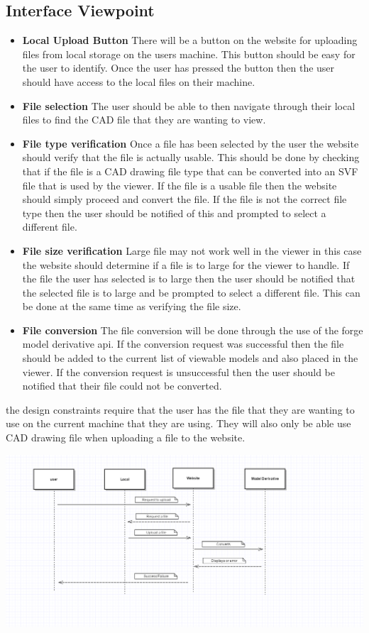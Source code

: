 \documentclass[letterpaper, 10pt, draftclsnofoot, compsoc, onecolumn]{IEEEtran}
\begin{document}
\subsection{Interface Viewpoint}
\begin{itemize}
	\item[]\textbf{Local Upload Button} There will be a button on the website for uploading files from local storage on the users machine. This button should be easy for the user to identify. Once the user has pressed the button then the user should have access to the local files on their machine.
	\item[]\textbf{File selection} The user should be able to then navigate through their local files to find the CAD file that they are wanting to view.
	\item[]\textbf{File type verification} Once a file has been selected by the user the website should verify that the file is actually usable. This should be done by checking that if the file is a CAD drawing file type that can be converted into an SVF file that is used by the viewer. If the file is a usable file then the website 			should simply proceed and convert the file. If the file is not the correct file type then the user should be notified of this and prompted to select a different file.  
	\item[]\textbf{File size verification} Large file may not work well in the viewer in this case the website should determine if a file is to large for the viewer to handle. If the file the user has selected is to large then the user should be notified that the selected file is to large and be prompted to select a different file.
	This can be done at the same time as verifying the file size.
	\item[]\textbf{File conversion} The file conversion will be done through the use of the forge model derivative api. If the conversion request was successful then the file should be added to the current list of viewable models and also placed in the viewer. If the conversion request is unsuccessful then the user should
	 be notified that their file could not be converted. 
\end{itemize}

the design constraints require that the user has the file that they are wanting to use on the current machine that they are using. They will also only be able use CAD drawing file when uploading a file to the website.  

\begin{flushleft}
	\includegraphics[scale=0.6]{localUpload.png}
\end{flushleft}
\end{document}
